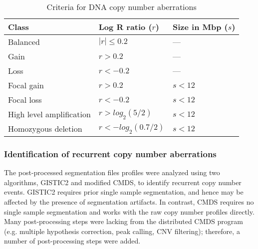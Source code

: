 \begin{table}[H]
	\caption[Criteria for DNA copy number aberrations]
	{
		Criteria for DNA copy number aberrations
	}
	\label{tab:cna-criteria}
	\footnotesize
	\setlength{\extrarowheight}{0.5em}
	\centering
	\begin{tabular}{l | l | l}
		\hline
		\textbf{Class} & \textbf{Log R ratio ($r$)} & \textbf{Size in Mbp ($s$)} \\
		\hline
		Balanced & $| r | \le 0.2$ & --- \\
		Gain & $r > 0.2$ & --- \\
		Loss & $r < -0.2$ & --- \\
		Focal gain & $r > 0.2$ & $s < 12$ \\
		Focal loss & $r < -0.2$ & $s < 12$ \\
		High level amplification & $r > log_2(5/2)$ & $s < 12$ \\
		Homozygous deletion & $r < -log_2(0.7/2)$ & $s < 12$ \\
		\hline
	\end{tabular}
\end{table}

\subsubsection{Identification of recurrent copy number aberrations}

The post-processed segmentation files profiles were analyzed using two algorithms, GISTIC2 and modified CMDS, to identify recurrent copy number events. GISTIC2 requires prior single sample segmentation, and hence may be affected by the presence of segmentation artifacts. In contrast, CMDS requires no single sample segmentation and works with the raw copy number profiles directly. Many post-processing steps were lacking from the distributed CMDS program (e.g. multiple hypothesis correction, peak calling, CNV filtering); therefore, a number of post-processing steps were added.

